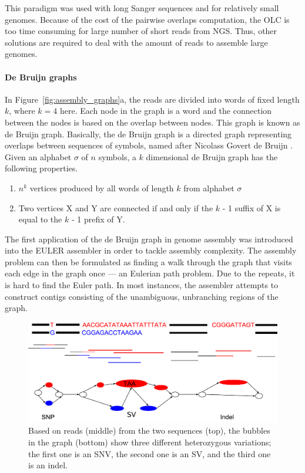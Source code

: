 This paradigm was used with long Sanger sequences and for relatively small
genomes. Because of the cost of the pairwise overlaps computation, the OLC is too time
consuming for large number of short reads from NGS. Thus, other solutions are required to deal with the amount of reads to assemble large genomes.

\paragraph{De Bruijn graphs}
In Figure~\ref{fig:assembly_graphs}a, the reads are divided into words of fixed length $k$, where $k=4$ here.
Each node in the graph is a word and the connection between the nodes is based on the overlap between nodes.
This graph is known as de Bruijn graph. 
Basically, the de Bruijn graph is a directed graph representing overlaps
between sequences of symbols, named after Nicolass Govert de Bruijn \citep{todd1933combinatorial}. Given an
alphabet $\sigma$ of $n$ symbols, a $k$ dimensional de Bruijn graph has the following properties.
\begin{enumerate}
 \item $n^k$ vertices produced by all words of length $k$ from alphabet $\sigma$
 \item Two vertices X and Y are connected if and only if the $k$ - 1
suffix of X is equal to the $k$ - 1 prefix of Y.
\end{enumerate}

The first application of the de Bruijn graph in genome assembly was introduced into
the EULER assembler \citep{pevzner2001eulerian} in order to tackle assembly complexity. 
The assembly problem can then be formulated as finding a walk
through the graph that visits each edge in the graph once --- an Eulerian path problem.
Due to the repeats, it is hard to find the Euler path. 
In most instances, the assembler attempts to construct
contigs consisting of the unambiguous, unbranching regions of the graph.
\begin{figure}[t!]\centering
\includegraphics[width=\columnwidth]{ex_sv.pdf}
\caption{Based on reads (middle) from the two sequences (top), the bubbles in the graph (bottom) show three different heterozygous variations; the first one is an SNV, the second one is an SV, and the third one is an indel. }
\label{fig:ex_sv}
\end{figure}

